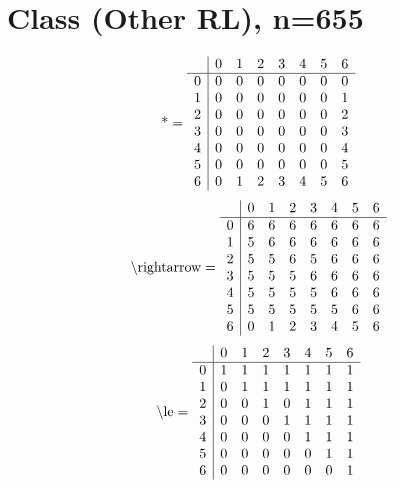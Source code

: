 \documentclass[11pt]{article}
\begin{document}
\section{Class (Other RL), n=655}
\[\text{*} = 
\begin{array}{r | r r r r r r r}
 & 0 & 1 & 2 & 3 & 4 & 5 & 6 \\ \hline
0 & 0 & 0 & 0 & 0 & 0 & 0 & 0 \\
1 & 0 & 0 & 0 & 0 & 0 & 0 & 1 \\
2 & 0 & 0 & 0 & 0 & 0 & 0 & 2 \\
3 & 0 & 0 & 0 & 0 & 0 & 0 & 3 \\
4 & 0 & 0 & 0 & 0 & 0 & 0 & 4 \\
5 & 0 & 0 & 0 & 0 & 0 & 0 & 5 \\
6 & 0 & 1 & 2 & 3 & 4 & 5 & 6 \\
\end{array}
\]
\[\text{\textbackslash rightarrow} = 
\begin{array}{r | r r r r r r r}
 & 0 & 1 & 2 & 3 & 4 & 5 & 6 \\ \hline
0 & 6 & 6 & 6 & 6 & 6 & 6 & 6 \\
1 & 5 & 6 & 6 & 6 & 6 & 6 & 6 \\
2 & 5 & 5 & 6 & 5 & 6 & 6 & 6 \\
3 & 5 & 5 & 5 & 6 & 6 & 6 & 6 \\
4 & 5 & 5 & 5 & 5 & 6 & 6 & 6 \\
5 & 5 & 5 & 5 & 5 & 5 & 6 & 6 \\
6 & 0 & 1 & 2 & 3 & 4 & 5 & 6 \\
\end{array}
\]
\[\text{\textbackslash le} = 
\begin{array}{r | r r r r r r r}
 & 0 & 1 & 2 & 3 & 4 & 5 & 6 \\ \hline
0 & 1 & 1 & 1 & 1 & 1 & 1 & 1 \\
1 & 0 & 1 & 1 & 1 & 1 & 1 & 1 \\
2 & 0 & 0 & 1 & 0 & 1 & 1 & 1 \\
3 & 0 & 0 & 0 & 1 & 1 & 1 & 1 \\
4 & 0 & 0 & 0 & 0 & 1 & 1 & 1 \\
5 & 0 & 0 & 0 & 0 & 0 & 1 & 1 \\
6 & 0 & 0 & 0 & 0 & 0 & 0 & 1 \\
\end{array}
\]
\end{document}
